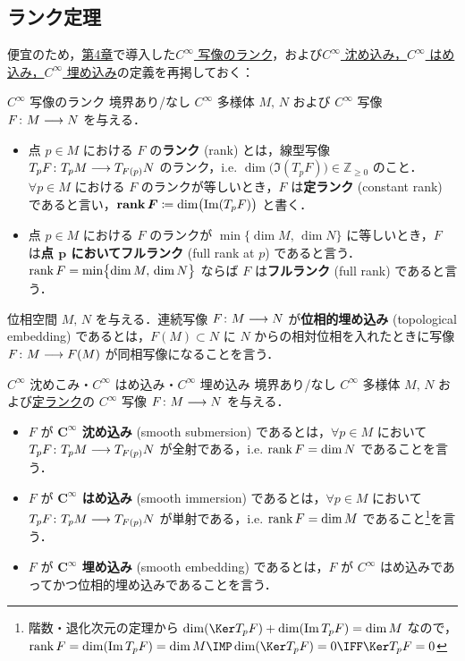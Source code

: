 \documentclass[geometry_main]{subfiles}
\begin{document}
\subsection{ランク定理}

便宜のため，\hyperref[chap4]{第4章}で導入した\hyperref[def:rank-smooth]{$C^\infty$ 写像のランク}，および\hyperref[def:submersiom-smooth]{$C^\infty$ 沈め込み，$C^\infty$ はめ込み，$C^\infty$ 埋め込み}の定義を再掲しておく：

\begin{mydef}[label=def:rank-smooth-appendix]{$C^\infty$ 写像のランク}
    境界あり/なし $C^\infty$ 多様体 $M,\, N$ および $C^\infty$ 写像 $F \colon M \longrightarrow N$ を与える．
    \begin{itemize}
        \item 点 $p \in M$ における $F$ の\textbf{ランク} (rank) とは，線型写像 $T_p F \colon T_p M \longrightarrow T_{F(p)} N$ のランク，i.e. $\dim \bigl(\Im (T_p F)\bigr) \in \mathbb{Z}_{\ge 0}$ のこと．$\forall p \in M$ における $F$ のランクが等しいとき，$F$ は\textbf{定ランク} (constant rank) であると言い，$\bm{\rank F} \coloneqq \dim \bigl(\Im (T_p F)\bigr)$ と書く．
        \item 点 $p \in M$ における $F$ のランクが $\min \bigl\{\dim M,\, \dim N\bigr\}$ に等しいとき，$F$ は\textbf{点 $\bm{p}$ においてフルランク} (full rank at $p$) であると言う．
        $\rank F = \min \bigl\{\dim M,\, \dim N\bigr\}$ ならば $F$ は\textbf{フルランク} (full rank) であると言う．
    \end{itemize}
\end{mydef}

位相空間 $M,\, N$ を与える．連続写像 $F \colon M \longrightarrow N$ が\textbf{位相的埋め込み} (topological embedding) であるとは，$F(M) \subset N$ に $N$ からの相対位相を入れたときに写像 $F \colon M \longrightarrow F(M)$ が同相写像になることを言う．

\begin{mydef}[label=def:submersion-smooth-appendix]{$C^\infty$ 沈めこみ・$C^\infty$ はめ込み・$C^\infty$ 埋め込み}
    境界あり/なし $C^\infty$ 多様体 $M,\, N$ および\hyperref[def:rank-smooth-appendix]{定ランク}の $C^\infty$ 写像 $F \colon M \longrightarrow N$ を与える．
    \begin{itemize}
        \item $F$ が\textbf{ $\bm{C^\infty}$ 沈め込み} (smooth submersion) であるとは，$\forall p \in M$ において $T_p F \colon T_p M \longrightarrow T_{F(p)} N$ が全射である，i.e. $\rank F = \dim N$ であることを言う．
        \item $F$ が\textbf{ $\bm{C^\infty}$ はめ込み} (smooth immersion) であるとは，$\forall p \in M$ において $T_p F \colon T_p M \longrightarrow T_{F(p)} N$ が単射である，i.e. $\rank F = \dim M$ であること\footnote{階数・退化次元の定理から $\dim (\Ker T_p F) + \dim (\Im T_p F) = \dim M$ なので，$\rank F = \dim (\Im T_p F) = \dim M \IMP \dim (\Ker T_p F) = 0 \IFF \Ker T_p F = 0$}を言う．
        \item $F$ が\textbf{ $\bm{C^\infty}$ 埋め込み} (smooth embedding) であるとは，$F$ が $C^\infty$ はめ込みであってかつ位相的埋め込みであることを言う．
    \end{itemize}
\end{mydef}
\end{document}

